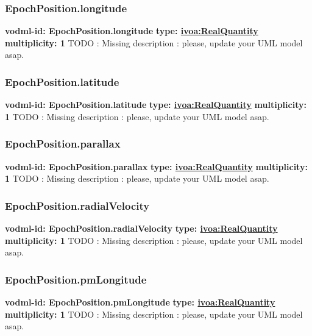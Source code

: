     \subsubsection{EpochPosition.longitude}
      \textbf{vodml-id: EpochPosition.longitude} \newline
      \textbf{type: \hyperref[sect:ivoa]{ivoa:RealQuantity}} \newline
      \textbf{multiplicity: 1} \newline
      TODO : Missing description : please, update your UML model asap.

    \subsubsection{EpochPosition.latitude}
      \textbf{vodml-id: EpochPosition.latitude} \newline
      \textbf{type: \hyperref[sect:ivoa]{ivoa:RealQuantity}} \newline
      \textbf{multiplicity: 1} \newline
      TODO : Missing description : please, update your UML model asap.

    \subsubsection{EpochPosition.parallax}
      \textbf{vodml-id: EpochPosition.parallax} \newline
      \textbf{type: \hyperref[sect:ivoa]{ivoa:RealQuantity}} \newline
      \textbf{multiplicity: 1} \newline
      TODO : Missing description : please, update your UML model asap.

    \subsubsection{EpochPosition.radialVelocity}
      \textbf{vodml-id: EpochPosition.radialVelocity} \newline
      \textbf{type: \hyperref[sect:ivoa]{ivoa:RealQuantity}} \newline
      \textbf{multiplicity: 1} \newline
      TODO : Missing description : please, update your UML model asap.

    \subsubsection{EpochPosition.pmLongitude}
      \textbf{vodml-id: EpochPosition.pmLongitude} \newline
      \textbf{type: \hyperref[sect:ivoa]{ivoa:RealQuantity}} \newline
      \textbf{multiplicity: 1} \newline
      TODO : Missing description : please, update your UML model asap.

